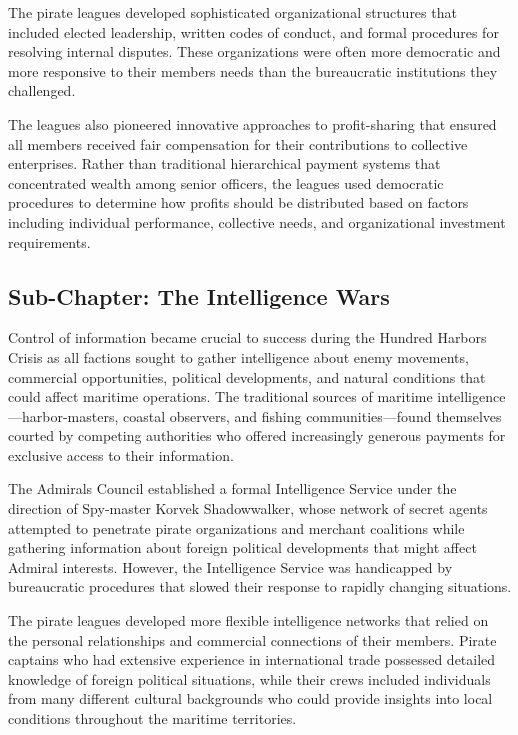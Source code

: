 The pirate leagues developed sophisticated organizational structures
that included elected leadership, written codes of conduct, and formal
procedures for resolving internal disputes. These organizations were
often more democratic and more responsive to their
members\textquotesingle{} needs than the bureaucratic institutions they
challenged.

The leagues also pioneered innovative approaches to profit-sharing that
ensured all members received fair compensation for their contributions
to collective enterprises. Rather than traditional hierarchical payment
systems that concentrated wealth among senior officers, the leagues used
democratic procedures to determine how profits should be distributed
based on factors including individual performance, collective needs, and
organizational investment requirements.

\subsection{Sub-Chapter: The Intelligence
Wars}\label{sub-chapter-the-intelligence-wars}

Control of information became crucial to success during the Hundred
Harbors Crisis as all factions sought to gather intelligence about enemy
movements, commercial opportunities, political developments, and natural
conditions that could affect maritime operations. The traditional
sources of maritime intelligence---harbor-masters, coastal observers,
and fishing communities---found themselves courted by competing
authorities who offered increasingly generous payments for exclusive
access to their information.

The Admiral\textquotesingle s Council established a formal Intelligence
Service under the direction of Spy-master Korvek Shadowwalker, whose
network of secret agents attempted to penetrate pirate organizations and
merchant coalitions while gathering information about foreign political
developments that might affect Admiral interests. However, the
Intelligence Service was handicapped by bureaucratic procedures that
slowed their response to rapidly changing situations.

The pirate leagues developed more flexible intelligence networks that
relied on the personal relationships and commercial connections of their
members. Pirate captains who had extensive experience in international
trade possessed detailed knowledge of foreign political situations,
while their crews included individuals from many different cultural
backgrounds who could provide insights into local conditions throughout
the maritime territories.

